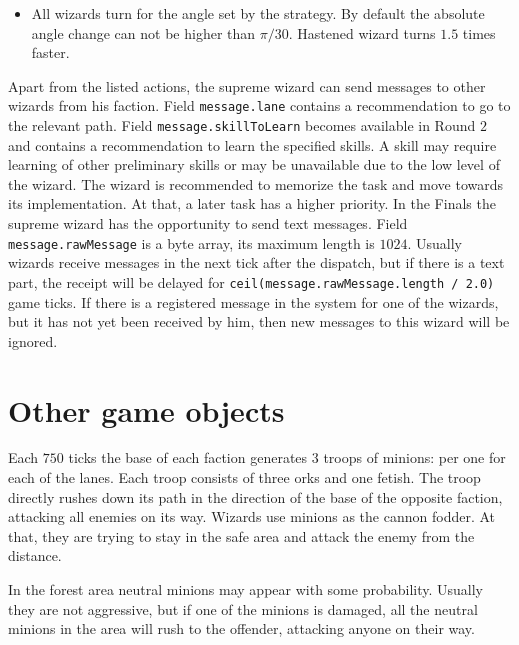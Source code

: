 \begin{itemize}
    \item All wizards turn for the angle set by the strategy. By default the absolute angle change can not be higher than $\pi / 30$.
          Hastened wizard turns $1.5$ times faster.
\end{itemize}
 
 
Apart from the listed actions, the supreme wizard can send messages to other wizards from his faction. Field
\texttt{message.lane} contains a recommendation to go to the relevant path. Field \texttt{message.skillToLearn} becomes available
in Round $2$ and contains a recommendation to learn the specified skills. A skill may require learning of other preliminary skills or may be
unavailable due to the low level of the wizard. The wizard is recommended to memorize the task and move towards
its implementation. At that, a later task has a higher priority. In the Finals the supreme wizard has
the opportunity to send text messages. Field \texttt{message.rawMessage} is a byte array, its maximum length is
$1024$. Usually wizards receive messages in the next tick after the dispatch, but if there is a text part, the receipt
will be delayed for \texttt{ceil(message.rawMessage.length / 2.0)} game ticks. If there is a registered message in the system for one of the
wizards, but it has not yet been received by him, then new messages to this wizard will be ignored.
 
\section{Other game objects}
 
Each $750$ ticks the base of each faction generates $3$ troops of minions: per one for each of the lanes. Each troop consists of three orks
and one fetish. The troop directly rushes down its path in the direction of the base of the opposite faction, attacking all enemies on its way.
Wizards use minions as the cannon fodder. At that, they are trying to stay in the safe area and attack the enemy from
the distance.
 
In the forest area neutral minions may appear with some probability. Usually they are not aggressive, but if one of the minions is damaged,
all the neutral minions in the area will rush to the offender, attacking anyone on their way.

